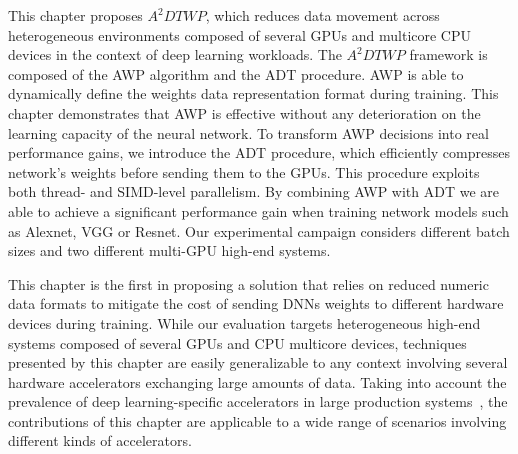 This chapter proposes $A^2DTWP$, which reduces data movement 
across heterogeneous environments composed of several GPUs and multicore CPU devices 
in the context of deep learning workloads.
The $A^2DTWP$ framework is composed of the AWP algorithm and the ADT procedure.
AWP is able to dynamically define the weights data representation format
during training. 
This chapter demonstrates that AWP is
effective without any deterioration on the learning capacity of
the neural network.
To transform AWP decisions into real performance gains, 
we introduce the ADT procedure, which efficiently compresses network's weights before sending them to the GPUs. 
This procedure exploits both thread- and SIMD-level parallelism. 
By combining AWP with ADT we are able to achieve a significant performance gain 
when training network models such as Alexnet, VGG or Resnet.
Our experimental campaign considers different batch sizes and two different multi-GPU high-end systems.

This chapter is the first in proposing a solution that relies on  
reduced numeric data formats to mitigate the cost of sending DNNs weights to 
different hardware devices during training.
While our evaluation targets heterogeneous high-end systems composed of several GPUs 
and CPU multicore devices, techniques presented by this chapter are easily generalizable 
to any context involving several hardware accelerators exchanging large 
amounts of data.
Taking into account the prevalence of deep learning-specific accelerators in large
production systems~\cite{Jouppi2017}, the contributions of this chapter are 
applicable to a wide range of scenarios involving different kinds of accelerators.
